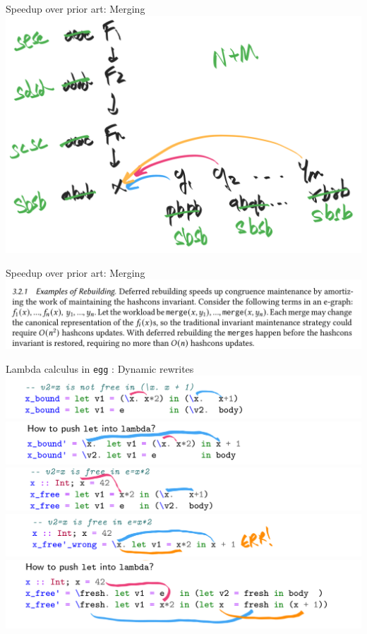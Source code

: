 \documentclass[8pt]{beamer}
\newcommand{\egg}{\texttt{egg} }
\begin{document}
\begin{frame}[fragile]{Speedup over prior art: Merging}
\includegraphics[width=\textwidth]{./eg-2-5.png}
\end{frame}



\begin{frame}[fragile]{Speedup over prior art: Merging}
\includegraphics[width=\textwidth]{./eg-2-paper-snippet.png}
\end{frame}



\begin{frame}[fragile]{Lambda calculus in \egg: Dynamic rewrites}
\includegraphics[width=\textwidth]{./lc-1.png}
\pause
\includegraphics[width=\textwidth]{./lc-2.png}
\pause
\includegraphics[width=\textwidth]{./lc-3.png}
\pause
\includegraphics[width=\textwidth]{./lc-4.png}
\pause
\includegraphics[width=\textwidth]{./lc-5.png}
\end{frame}
\end{document}
